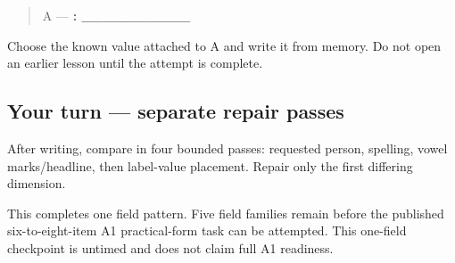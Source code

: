 \begin{quote}
A — \textbf{: \_\_\_\_\_\_\_\_\_\_}
\end{quote}

Choose the known value attached to A and write it from memory. Do not open an earlier lesson until the attempt is complete.

\subsection*{Your turn — separate repair passes}
After writing, compare in four bounded passes: requested person, spelling, vowel marks/headline, then label-value placement. Repair only the first differing dimension.

\begin{tcolorbox}[breakable,colback=teal!4,colframe=teal!35!black,title={Before you move on}]
This completes one field pattern. Five field families remain before the published six-to-eight-item A1 practical-form task can be attempted. This one-field checkpoint is untimed and does not claim full A1 readiness.
\end{tcolorbox}
